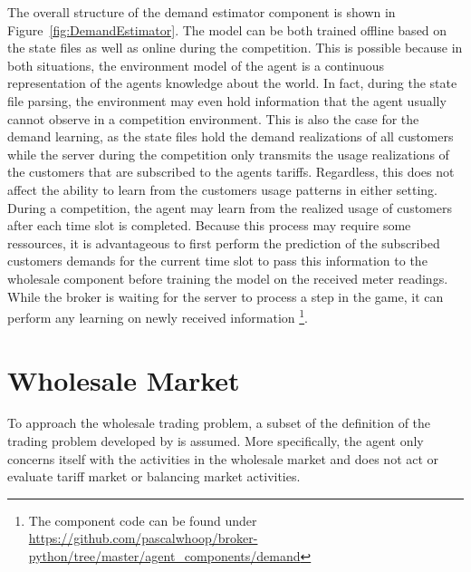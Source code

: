 The overall structure of the demand estimator component is shown in Figure~\ref{fig:DemandEstimator}. The model can be
both trained offline based on the state files as well as online during the competition. This is possible because in both
situations, the environment model of the agent is a continuous representation of the agents knowledge about the world.
In fact, during the state file parsing, the environment may even hold information that the agent usually cannot observe
in a competition environment. This is also the case for the demand learning, as the state files hold the demand
realizations of all customers while the server during the competition only transmits the usage realizations of the
customers that are subscribed to the agents tariffs. Regardless, this does not affect the ability to learn from the
customers usage patterns in either setting. During a competition, the agent may learn from the realized usage of
customers after each time slot is completed. Because this process may require some ressources, it is advantageous to
first perform the prediction of the subscribed customers demands for the current time slot to pass this information to
the wholesale component before training the model on the received meter readings. While the broker is waiting for the
server to process a step in the game, it can perform any learning on newly received information \footnote{The component code can be
found under \url{https://github.com/pascalwhoop/broker-python/tree/master/agent_components/demand}}.


\section{Wholesale Market}
\label{sec:wholesale_market}

To approach the wholesale trading problem, a subset of the definition of the trading problem developed by
\citet{tactexurieli2016mdp} is assumed. More specifically, the agent only concerns itself with the activities in the
wholesale market and does not act or evaluate tariff market or balancing market activities.

